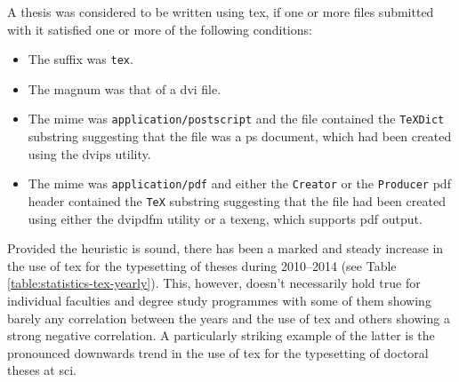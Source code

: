 \documentclass[12pt,twoside,cover,color,table]%
  {fithesis3/fithesis3/fithesis3} %
\begin{document}
  A thesis was considered to be written using \gls{tex}, if one
  or more files submitted with it satisfied one or more of the
  following conditions: \begin{itemize}
    \item The suffix was \texttt{tex}.
    \item The \gls{magnum} was that of a \acrshort{dvi} file.
    \item The \gls{mime} was \texttt{application/postscript} and
      the file contained the \texttt{TeXDict} substring suggesting
      that the file was a \gls{ps} document, which had been created
      using the \textsf{dvips} utility.
    \item The \gls{mime} was \texttt{application/pdf} and either
      the \texttt{Creator} or the \texttt{Producer} \gls{pdf}
      header contained the \texttt{TeX} substring suggesting that
      the file had been created using either the \textsf{dvipdfm}
      utility or a \gls{texeng}, which supports \gls{pdf} output.
  \end{itemize} Provided the heuristic is sound, there has
  been a marked and
  steady increase in the use of \gls{tex} for the typesetting of
  theses during 2010--2014 (see Table
  \ref{table:statistics-tex-yearly}). This, however, doesn't
  necessarily hold true for individual faculties and degree study
  programmes with some of them showing barely any correlation
  between the years and the use of \gls{tex} and others showing a
  strong negative correlation. A particularly striking example of
  the latter is the pronounced downwards trend in the use of
  \gls{tex} for the typesetting of doctoral theses at \gls{sci}.
\end{document}
